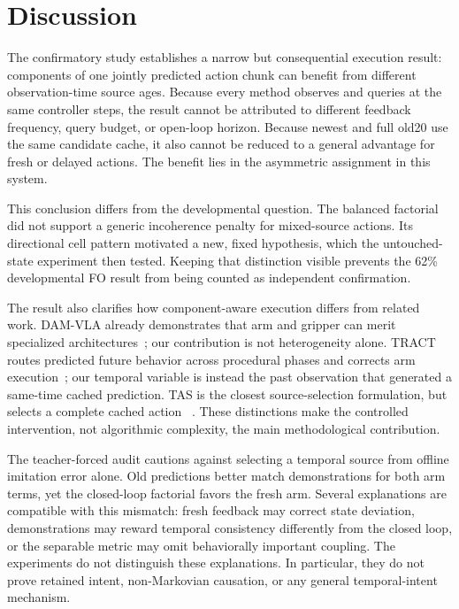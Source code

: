 \section{Discussion}
\label{sec:discussion}

The confirmatory study establishes a narrow but consequential execution result:
components of one jointly predicted action chunk can benefit from different
observation-time source ages. Because every method observes and queries at the
same controller steps, the result cannot be attributed to different feedback
frequency, query budget, or open-loop horizon. Because newest and full old20
use the same candidate cache, it also cannot be reduced to a general advantage
for fresh or delayed actions. The benefit lies in the asymmetric assignment in
this system.

This conclusion differs from the developmental question. The balanced
factorial did not support a generic incoherence penalty for mixed-source
actions. Its directional cell pattern motivated a new, fixed hypothesis, which
the untouched-state experiment then tested. Keeping that distinction visible
prevents the 62\% developmental FO result from being counted as independent
confirmation.

The result also clarifies how component-aware execution differs from related
work. DAM-VLA already demonstrates that arm and gripper can merit specialized
architectures~\cite{peng2026damvla}; our contribution is not heterogeneity
alone. TRACT routes predicted future behavior across procedural phases and
corrects arm execution~\cite{liu2026tract}; our temporal variable is instead
the past observation that generated a same-time cached prediction. TAS is the
closest source-selection formulation, but selects a complete cached action
~\cite{weng2025tas}. These distinctions make the controlled intervention, not
algorithmic complexity, the main methodological contribution.

The teacher-forced audit cautions against selecting a temporal source from
offline imitation error alone. Old predictions better match demonstrations for
both arm terms, yet the closed-loop factorial favors the fresh arm. Several
explanations are compatible with this mismatch: fresh feedback may correct
state deviation, demonstrations may reward temporal consistency differently
from the closed loop, or the separable metric may omit behaviorally important
coupling. The experiments do not distinguish these explanations. In
particular, they do not prove retained intent, non-Markovian causation, or any
general temporal-intent mechanism.

